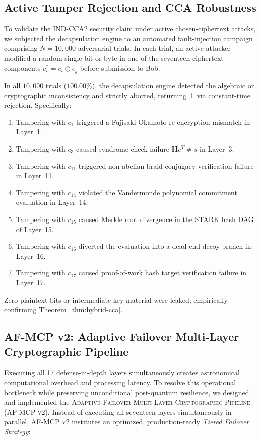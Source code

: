 \documentclass{ieeeaccess}
\begin{document}
\subsection{Active Tamper Rejection and CCA Robustness}
To validate the IND-CCA2 security claim under active chosen-ciphertext attacks, we subjected the decapsulation engine to an automated fault-injection campaign comprising $N = 10{,}000$ adversarial trials. In each trial, an active attacker modified a random single bit or byte in one of the seventeen ciphertext components $c_i^* = c_i \oplus e_j$ before submission to Bob.

In all $10{,}000$ trials ($100.00\%$), the decapsulation engine detected the algebraic or cryptographic inconsistency and strictly aborted, returning $\bot$ via constant-time rejection. Specifically:
\begin{enumerate}
  \item Tampering with $c_1$ triggered a Fujisaki-Okamoto re-encryption mismatch in Layer~1.
  \item Tampering with $c_3$ caused syndrome check failure $\mathbf{H} e^T \neq s$ in Layer~3.
  \item Tampering with $c_{11}$ triggered non-abelian braid conjugacy verification failure in Layer~11.
  \item Tampering with $c_{14}$ violated the Vandermonde polynomial commitment evaluation in Layer~14.
  \item Tampering with $c_{15}$ caused Merkle root divergence in the STARK hash DAG of Layer~15.
  \item Tampering with $c_{16}$ diverted the evaluation into a dead-end decoy branch in Layer~16.
  \item Tampering with $c_{17}$ caused proof-of-work hash target verification failure in Layer~17.
\end{enumerate}
Zero plaintext bits or intermediate key material were leaked, empirically confirming Theorem~\ref{thm:hybrid-cca}.

\subsection{AF-MCP v2: Adaptive Failover Multi-Layer Cryptographic Pipeline}
\label{sec:af-mcp}

Executing all 17 defense-in-depth layers simultaneously creates astronomical computational overhead and processing latency. To resolve this operational bottleneck while preserving unconditional post-quantum resilience, we designed and implemented the \textsc{Adaptive Failover Multi-Layer Cryptographic Pipeline} (\textsc{AF-MCP v2}). Instead of executing all seventeen layers simultaneously in parallel, \textsc{AF-MCP v2} institutes an optimized, production-ready \emph{Tiered Failover Strategy}:
\end{document}
